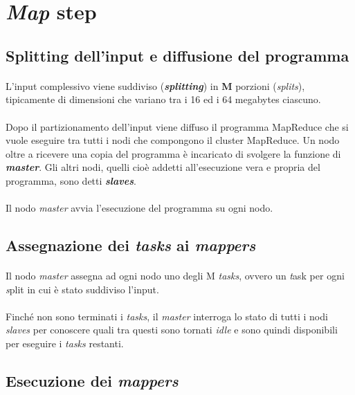 \documentclass[a4paper,11pt]{report}
\begin{document}
\section{\emph{Map} step}
\subsection{Splitting dell'input e diffusione del programma}
\paragraph{}
L'input complessivo viene suddiviso (\emph{\textbf{splitting}}) in \textbf{M} porzioni (\emph{splits}), tipicamente di dimensioni
che variano tra i 16 ed i 64 megabytes ciascuno.
\paragraph{}
Dopo il partizionamento dell'input viene diffuso il programma MapReduce che si vuole eseguire tra tutti i nodi che compongono il cluster
MapReduce.
Un nodo oltre a ricevere una copia del programma è incaricato di svolgere la funzione di \emph{\textbf{master}}. Gli altri nodi, quelli cioè
addetti all'esecuzione vera e propria del
programma, sono detti \emph{\textbf{slaves}}.
\paragraph{}
Il nodo \emph{master} avvia l'esecuzione del programma su ogni nodo.

\subsection{Assegnazione dei \emph{tasks} ai \emph{mappers}}
\paragraph{}
Il nodo \emph{master} assegna ad ogni nodo uno degli M \emph{tasks}, ovvero un \emph task per ogni \emph split in cui è stato suddiviso
l'input.
\paragraph{}
Finché non sono terminati i \emph{tasks}, il \emph{master} interroga lo stato di tutti i nodi \emph{slaves} per conoscere quali tra questi 
sono tornati \emph{idle} e sono quindi disponibili per eseguire i \emph{tasks} restanti.

\subsection{Esecuzione dei \emph{mappers}}
\end{document}
